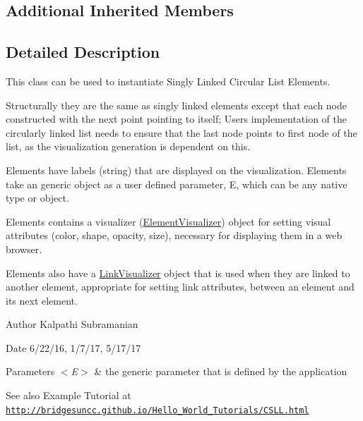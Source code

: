 \subsection*{Additional Inherited Members}


\subsection{Detailed Description}
This class can be used to instantiate Singly Linked Circular List Elements. 

Structurally they are the same as singly linked elements except that each node constructed with the next point pointing to itself; User\textquotesingle{}s implementation of the circularly linked list needs to ensure that the last node points to first node of the list, as the visualization generation is dependent on this.

Elements have labels (string) that are displayed on the visualization. Elements take an generic object as a user defined parameter, E, which can be any native type or object.

Elements contains a visualizer (\hyperlink{namespace_element_visualizer}{Element\+Visualizer}) object for setting visual attributes (color, shape, opacity, size), necessary for displaying them in a web browser.

Elements also have a \hyperlink{namespace_link_visualizer}{Link\+Visualizer} object that is used when they are linked to another element, appropriate for setting link attributes, between an element and its next element.

\begin{DoxyAuthor}{Author}
Kalpathi Subramanian
\end{DoxyAuthor}
\begin{DoxyDate}{Date}
6/22/16, 1/7/17, 5/17/17
\end{DoxyDate}

\begin{DoxyParams}{Parameters}
{\em $<$\+E$>$} & the generic parameter that is defined by the application\\
\hline
\end{DoxyParams}
\begin{DoxySeeAlso}{See also}
Example Tutorial at ~\newline
 \href{http://bridgesuncc.github.io/Hello_World_Tutorials/CSLL.html}{\tt http\+://bridgesuncc.\+github.\+io/\+Hello\+\_\+\+World\+\_\+\+Tutorials/\+C\+S\+L\+L.\+html} 
\end{DoxySeeAlso}


